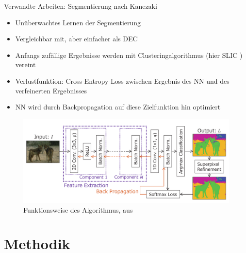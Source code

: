 \documentclass{beamer}
\begin{document}
\begin{frame}[allowframebreaks]{Verwandte Arbeiten: Segmentierung nach Kanezaki \cite{kanezaki_18}}
	\begin{itemize}
		\item Unüberwachtes Lernen der Segmentierung
		\item Vergleichbar mit, aber einfacher als DEC
		\item Anfangs zufällige Ergebnisse werden mit Clusteringalgorithmus (hier SLIC \cite{achanta_10}) vereint
		\item Verlustfunktion: Cross-Entropy-Loss zwischen Ergebnis des NN und des verfeinerten Ergebnisses
		\item NN wird durch Backpropagation auf diese Zielfunktion hin optimiert
	\end{itemize}
	\newpage
	\begin{figure}
		\includegraphics[height=25ex,keepaspectratio]{gfx/Kan18_01.png}
		\caption{Funktionsweise des Algorithmus, aus \cite{kanezaki_18}}
	\end{figure}
\end{frame}

\section{Methodik}
\end{document}
